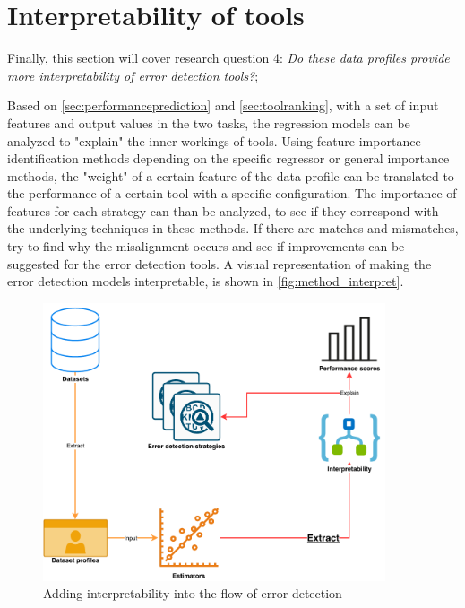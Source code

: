 \newpage
\section{Interpretability of tools}
\label{sec:interpretabilityoftools}
Finally, this section will cover research question 4: \textit{Do these data profiles provide more interpretability of error detection tools?};

Based on \autoref{sec:performanceprediction} and \autoref{sec:toolranking}, with a set of input features and output values in the two tasks, the regression models can be analyzed to "explain" the inner workings of tools. Using feature importance identification methods depending on the specific regressor or general importance methods, the "weight" of a certain feature of the data profile can be translated to the performance of a certain tool with a specific configuration. The importance of features for each strategy can than be analyzed, to see if they correspond with the underlying techniques in these methods. If there are matches and mismatches, try to find why the misalignment occurs and see if improvements can be suggested for the error detection tools. A visual representation of making the error detection models interpretable, is shown in \autoref{fig:method_interpret}.

\begin{figure}[h]
    \centering
    \includegraphics[width=0.9\textwidth]{thesis/Figures/Method/PerformanceEstimation-Interpretability.pdf}
    \caption{Adding interpretability into the flow of error detection}
    \label{fig:method_interpret}
\end{figure}

